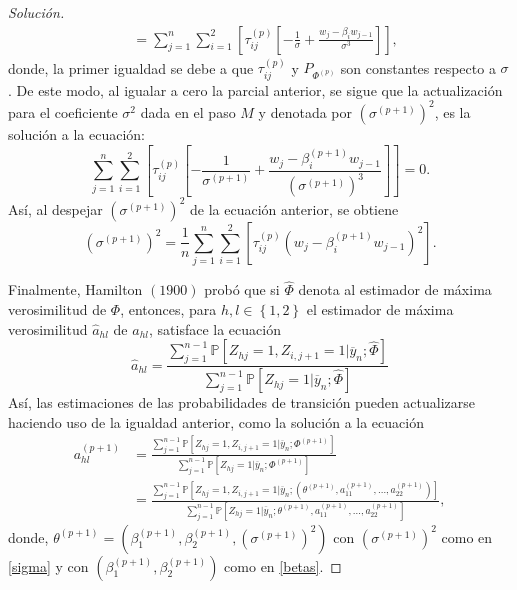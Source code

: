 \documentclass[10.5pt,notitlepage]{article}
\newenvironment{solucion}
  {\begin{proof}[Solución]}
  {\end{proof}}
\newcommand{\PP}{\mathbb{P}}
\newcommand{\corch}[1]{\left[ #1 \right]}
\newcommand{\kis}[1]{\left\{ #1 \right\}}
\newcommand{\pare}[1]{\left( #1 \right)}
\theoremstyle{plain}
\begin{document}
\begin{solucion}
\begin{align*}
&=  \sum_{j = 1}^{n}\sum_{i = 1}^{2}\corch{\tau_{ij}^{(p)}\corch{-\frac{1}{\sigma} + \frac{w_{j} - \beta_i w_{j-1}}{\sigma^3}}}, 
\end{align*}
donde, la primer igualdad se debe a que \(\tau_{ij}^{(p)}\) y \(P_{\Phi^{(p)}}\) son constantes respecto a \(\sigma\). De este modo, al igualar a cero la parcial anterior, se sigue que la actualización para el coeficiente \(\sigma^2\) dada en el paso \(M\) y denotada por \((\sigma^{(p+1)})^2\), es la solución a la ecuación: 
\[
 \sum_{j = 1}^{n}\sum_{i = 1}^{2}\corch{\tau_{ij}^{(p)}\corch{-\frac{1}{\sigma^{(p+1)}} + \frac{w_{j} - \beta_{i}^{(p+1)} w_{j-1}}{(\sigma^{(p+1)})^3}}} = 0.
\]
Así, al despejar \((\sigma^{(p+1)})^2\) de la ecuación anterior, se obtiene 
\begin{equation}\label{sigma}
(\sigma^{(p+1)})^2 = \frac{1}{n}\sum_{j = 1}^{n}\sum_{i = 1}^{2}\corch{\tau_{ij}^{(p)}(w_{j} - \beta_{i}^{(p+1)}w_{j-1})^2}.    
\end{equation}


Finalmente, Hamilton \((1900)\) probó que si \(\hat{\Phi}\) denota al estimador de máxima verosimilitud de \(\Phi\), entonces, para \(h,l \in \kis{1,2}\) el estimador de máxima verosimilitud \(\hat{a}_{hl}\) de \(a_{hl}\), satisface la ecuación 
\[
\hat{a}_{hl} = \frac{\sum_{j = 1}^{n-1}\PP[Z_{hj} = 1, Z_{i,j+1} = 1 | \overline{y}_{n}; \hat{\Phi}]}{\sum_{j = 1}^{n-1}\PP[Z_{hj} = 1 | \overline{y}_{n}; \hat{\Phi}]}
\]
Así, las estimaciones de las probabilidades de transición pueden actualizarse haciendo uso de la igualdad anterior, como la solución a la ecuación
\begin{align*}
a_{hl}^{(p+1)} &= \frac{\sum_{j = 1}^{n-1}\PP[Z_{hj} = 1, Z_{i,j+1} = 1 | \overline{y}_{n}; \Phi^{(p+1)}]}{\sum_{j = 1}^{n-1}\PP[Z_{hj} = 1 | \overline{y}_{n}; \Phi^{(p+1)}]} \\
&= \frac{\sum_{j = 1}^{n-1}\PP[Z_{hj} = 1, Z_{i,j+1} = 1 | \overline{y}_{n}; (\theta^{(p+1)},a_{11}^{(p+1)}, \hdots,a_{22}^{(p+1)} ) ]}{\sum_{j = 1}^{n-1}\PP[Z_{hj} = 1 | \overline{y}_{n}; \theta^{(p+1)},a_{11}^{(p+1)}, \hdots,a_{22}^{(p+1)} ]},
\end{align*}
donde, \(\theta^{(p+1)} = (\beta_{1}^{(p+1)}, \beta_{2}^{(p+1)}, (\sigma^{(p+1)})^2 )\) con \((\sigma^{(p+1)})^2 \) como en \eqref{sigma} y con \(\pare{\beta_{1}^{(p+1)},\beta_{2}^{(p+1)}}\) como en \eqref{betas}.
\end{solucion}
\begin{exo}

\end{exo}
\end{document}
